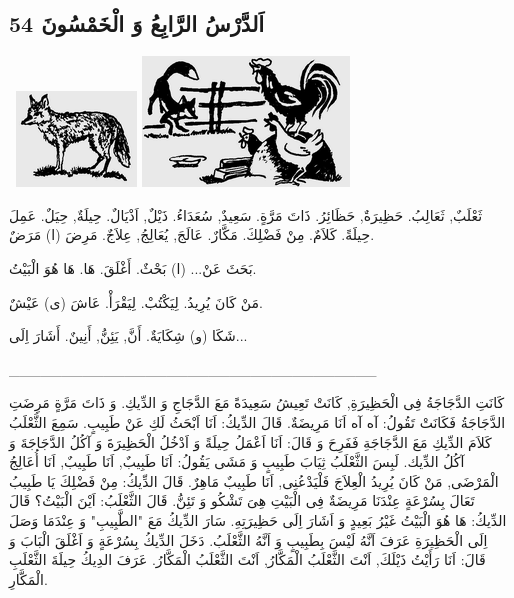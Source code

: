 \documentclass[a5paper]{article}
\begin{document}
\subsection{اَلدَّرْسُ الرَّابِعُ وَ الْخَمْسُونَ 54}
\  \includegraphics[width=1.2602in,height=1in]{MuhammadBagauddinlatinized-img176.png}   \includegraphics[width=2.1665in,height=1.3646in]{MuhammadBagauddinlatinized-img177.png} 

ثَعْلَبٌ, ثَعَالِبُ. حَظِيرَةٌ, حَظَائِرُ. ذَاتَ مَرَّةٍ. سَعِيدٌ, سُعَدَاءُ. ذَيْلٌ, اَذْيَالٌ. حِيلَةٌ, حِيَلٌ. عَمِلَ حِيلَةً. كَلاَمٌ. مِنْ فَضْلِكَ. مَكَّارٌ. عَالَجَ, يُعَالِجُ, عِلاَجٌ. مَرِضَ (ا) مَرَضٌ. 

بَحَثَ عَنْ... (ا) بَحْثٌ. أَغْلَقَ. هَا. هَا هُوَ الْبَيْتُ. 

مَنْ كَانَ يُرِيدُ. لِيَكْتُبْ. لِيَقْرَأْ. عَاشَ (ى) عَيْشٌ. 

شَكَا (و) شِكَايَةٌ. أَنَّ, يَئِنُّ, أَنِينٌ. أَشَارَ اِلَى...

\_\_\_\_\_\_\_\_\_\_\_\_\_\_\_\_\_\_\_\_\_\_\_\_\_\_\_\_\_\_\_\_\_\_\_

كَانَتِ الدَّجَاجَةُ فِى الْحَظِيرَةِ, كَانَتْ تَعِيشُ سَعِيدَةً مَعَ الدَّجَاجِ وَ الدِّيكِ. وَ ذَاتَ مَرَّةٍ مَرِضَتِ الدَّجَاجَةُ فَكَانَتْ تَقُولُ: آه آه اَنَا مَرِيضَةٌ. قَالَ الدِّيكُ: اَنَا اَبْحَثُ لَكِ عَنْ طَبِيبٍ. سَمِعَ الثَّعْلَبُ كَلاَمَ الدِّيكِ مَعَ الدَّجَاجَةِ فَفَرِحَ وَ قَالَ: اَنَا اَعْمَلُ حِيلَةً وَ اَدْخُلُ الْحَظِيرَةَ وَ آكُلُ الدَّجَاجَةَ وَ آكُلُ الدِّيك. لَبِسَ الثَّعْلَبُ ثِيَابَ طَبِيبٍ وَ مَشَى يَقُولُ: اَنَا طَبِيبٌ, اَنَا طَبِيبٌ, اَنَا أُعَالِجُ الْمَرْضَى, مَنْ كَانَ يُرِيدُ الْعِلاَجَ فَلْيَدْعُنِى, اَنَا طَبِيبٌ مَاهِرٌ. قَالَ الدِّيكُ: مِنْ فَضْلِكَ يَا طَبِيبُ تَعَالَ بِسُرْعَةٍ عِنْدَنَا مَرِيضَةٌ فِى الْبَيْتِ هِىَ تَشْكُو وَ تَئِنُّ. قَالَ الثَّعْلَبُ: اَيْنَ الْبَيْتُ؟ قَالَ الدِّيكُ: هَا هُوَ الْبَيْتُ غَيْرُ بَعِيدٍ وَ اَشَارَ اِلَى حَظِيرَتِهِ. سَارَ الدِّيكُ مَعَ "الطَّبِيبِ" وَ عِنْدَمَا وَصَلَ اِلَى الْحَظِيرَةِ عَرَفَ اَنَّهُ لَيْسَ بِطَبِيبٍ وَ اَنَّهُ الثَّعْلَبُ. دَخَلَ الدِّيكُ بِسُرْعَةٍ وَ اَغْلَقَ الْبَابَ وَ قَالَ: اَنَا رَأَيْتُ ذَيْلَكَ, اَنْتَ الثَّعْلَبُ الْمَكَّارُ, اَنْتَ الثَّعْلَبُ الْمَكَّارُ. عَرَفَ الدِيكُ حِيلَةَ الثَّعْلَبِ الْمَكَّارِ.
\end{document}
